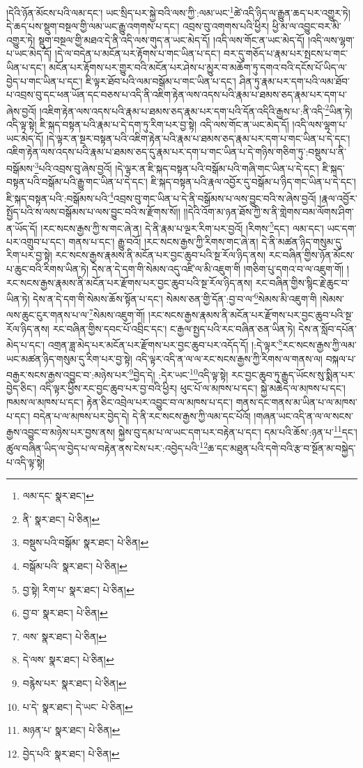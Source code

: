 །དེའི་ཉོན་མོངས་པའི་ལམ་དང་། ཡང་སྲིད་པར་སྐྱེ་བའི་ལས་ཀྱི་:ལམ་ཡང་\footnote{ལམ་དང་  སྣར་ཐང་། }ཚེ་འདི་ཉིད་ལ་རྒྱུན་ཆད་པར་འགྱུར་ཏེ། དེ་ཆད་པས་སྡུག་བསྔལ་གྱི་ལམ་ཡང་རྒྱུ་འགགས་པ་དང་། འབྲས་བུ་འགགས་པའི་ཕྱིར། ཕྱི་མ་ལ་འབྱུང་བར་མི་འགྱུར་ཏེ། སྡུག་བསྔལ་གྱི་མཐའ་དེ་ནི་འདི་ལས་གུད་ན་ཡང་མེད་དོ། །འདི་ལས་གོང་ན་ཡང་མེད་དོ། །འདི་ལས་ལྷག་པ་ཡང་མེད་དོ། །དེ་ལ་བདེན་པ་མངོན་པར་རྟོགས་པ་གང་ཡིན་པ་དང་། བར་དུ་གཅོད་པ་རྣམ་པར་སྤངས་པ་གང་ཡིན་པ་དང་། མངོན་པར་རྟོགས་པར་གྱུར་བའི་མངོན་པར་ཤེས་པ་མྱུར་བ་མཆོག་ཏུ་དགའ་བའི་དངོས་པོ་ཡིད་ལ་བྱེད་པ་གང་ཡིན་པ་དང་། ཇི་ལྟར་ཐོབ་པའི་ལམ་བསྒོམ་པ་གང་ཡིན་པ་དང་། ཤིན་ཏུ་རྣམ་པར་དག་པའི་ལམ་ཐོབ་པ་འབྲས་བུ་དང་ཕན་ཡོན་དང་བཅས་པ་འདི་ནི་འཇིག་རྟེན་ལས་འདས་པའི་རྣམ་པ་ཐམས་ཅད་རྣམ་པར་དག་པ་ཞེས་བྱའོ། །འཇིག་རྟེན་ལས་འདས་པའི་རྣམ་པ་ཐམས་ཅད་རྣམ་པར་དག་པའི་དོན་འདིའི་རྒྱས་པ་:ནི་འདི་\footnote{ནི་  སྣར་ཐང་།  པེ་ཅིན། }ཡིན་ཏེ། འདི་ལྟ་སྟེ། ཇི་སྐད་བསྟན་པའི་རྣམ་པ་དེ་དག་ཏུ་རིག་པར་བྱ་སྟེ། འདི་ལས་གོང་ན་ཡང་མེད་དོ། །འདི་ལས་ལྷག་པ་ཡང་མེད་དོ། །དེ་ལྟར་ན་སྔར་བསྟན་པའི་འཇིག་རྟེན་པའི་རྣམ་པ་ཐམས་ཅད་རྣམ་པར་དག་པ་གང་ཡིན་པ་དེ་དང་། འཇིག་རྟེན་ལས་འདས་པའི་རྣམ་པ་ཐམས་ཅད་དུ་རྣམ་པར་དག་པ་གང་ཡིན་པ་དེ་གཉིས་གཅིག་ཏུ་:བསྡུས་པ་ནི་བསྒོམས་\footnote{བསྡུས་པའི་བསྒོམ་  སྣར་ཐང་།  པེ་ཅིན། }པའི་འབྲས་བུ་ཞེས་བྱའོ། །དེ་ལྟར་ན་ཇི་སྐད་བསྟན་པའི་བསྒོམ་པའི་གཞི་གང་ཡིན་པ་དེ་དང་། ཇི་སྐད་བསྟན་པའི་བསྒོམ་པའི་རྒྱུ་གང་ཡིན་པ་དེ་དང་། ཇི་སྐད་བསྟན་པའི་རྣལ་འབྱོར་དུ་བསྒོམ་པ་ཉིད་གང་ཡིན་པ་དེ་དང་། ཇི་སྐད་བསྟན་པའི་:བསྒོམས་པའི་\footnote{བསྒོམ་པའི་  སྣར་ཐང་།  པེ་ཅིན། }འབྲས་བུ་གང་ཡིན་པ་དེ་ནི་བསྒོམས་པ་ལས་བྱུང་བའི་ས་ཞེས་བྱའོ། །རྣལ་འབྱོར་སྤྱོད་པའི་ས་ལས་བསྒོམས་པ་ལས་བྱུང་བའི་ས་རྫོགས་སོ།། །།དེའི་འོག་མ་ཉན་ཐོས་ཀྱི་ས་ནི་གླེགས་བམ་ལོགས་ཤིག་ན་ཡོད་དོ། །རང་སངས་རྒྱས་ཀྱི་ས་གང་ཞེ་ན། དེ་ནི་རྣམ་པ་ལྔར་རིག་པར་བྱའོ། །རིགས་\footnote{བྱ་སྟེ། རིག་པ་  སྣར་ཐང་།  པེ་ཅིན། }དང་། ལམ་དང་། ཡང་དག་པར་འགྲུབ་པ་དང་། གནས་པ་དང་། རྒྱུ་བའོ། །རང་སངས་རྒྱས་ཀྱི་རིགས་གང་ཞེ་ན། དེ་ནི་མཚན་ཉིད་གསུམ་དུ་རིག་པར་བྱ་སྟེ། རང་སངས་རྒྱས་རྣམས་ནི་མངོན་པར་བྱང་ཆུབ་པའི་སྔ་རོལ་ཉིད་ནས། རང་བཞིན་གྱིས་ཉོན་མོངས་པ་ཆུང་བའི་རིགས་ཡིན་ཏེ། དེས་ན་དེ་དག་གི་སེམས་འདུ་འཛི་ལ་མི་འཇུག་གི །གཅིག་པུ་དགའ་བ་ལ་འཇུག་གོ། །རང་སངས་རྒྱས་རྣམས་ནི་མངོན་པར་རྫོགས་པར་བྱང་ཆུབ་པའི་སྔ་རོལ་ཉིད་ནས། རང་བཞིན་གྱིས་སྙིང་རྗེ་ཆུང་བ་ཡིན་ཏེ། དེས་ན་དེ་དག་གི་སེམས་ཆོས་སྟོན་པ་དང་། སེམས་ཅན་གྱི་དོན་:བྱ་བ་ལ་\footnote{བྱ་བ་  སྣར་ཐང་།  པེ་ཅིན། }སེམས་མི་འཇུག་གི །སེམས་ལས་ཆུང་ངུར་གནས་པ་ལ་\footnote{ལས་  སྣར་ཐང་།  པེ་ཅིན། }སེམས་འཇུག་གོ། །རང་སངས་རྒྱས་རྣམས་ནི་མངོན་པར་རྫོགས་པར་བྱང་ཆུབ་པའི་སྔ་རོལ་ཉིད་ནས། རང་བཞིན་གྱིས་དབང་པོ་འབྲིང་དང་། ང་རྒྱལ་སྤྱད་པའི་རང་བཞིན་ཅན་ཡིན་ཏེ། དེས་ན་སློབ་དཔོན་མེད་པ་དང་། འགྲན་ཟླ་མེད་པར་མངོན་པར་རྫོགས་པར་བྱང་ཆུབ་པར་འདོད་དོ། །:དེ་ལྟར་\footnote{དེ་ལས་  སྣར་ཐང་།  པེ་ཅིན། }རང་སངས་རྒྱས་ཀྱི་ལམ་ཡང་མཚན་ཉིད་གསུམ་དུ་རིག་པར་བྱ་སྟེ། འདི་ལྟར་འདི་ན་ལ་ལ་རང་སངས་རྒྱས་ཀྱི་རིགས་ལ་གནས་ལ། བསྐལ་པ་བརྒྱར་སངས་རྒྱས་འབྱུང་བ་:མཉེས་པར་\footnote{བརྙེས་པར་  སྣར་ཐང་།  པེ་ཅིན། }བྱེད་དེ། :དེར་ཡང་\footnote{པ་དེ་  སྣར་ཐང་། དེ་ཡང་  པེ་ཅིན། }འདི་ལྟ་སྟེ། རང་བྱང་ཆུབ་ཏུ་རྒྱུད་ཡོངས་སུ་སྨིན་པར་བྱེད་ཅིང་། འདི་ལྟར་ཕྱིས་རང་བྱང་ཆུབ་པར་བྱ་བའི་ཕྱིར། ཕུང་པོ་ལ་མཁས་པ་དང་། སྐྱེ་མཆེད་ལ་མཁས་པ་དང་། ཁམས་ལ་མཁས་པ་དང་། རྟེན་ཅིང་འབྲེལ་པར་འབྱུང་བ་ལ་མཁས་པ་དང་། གནས་དང་གནས་མ་ཡིན་པ་ལ་མཁས་པ་དང་། བདེན་པ་ལ་མཁས་པར་བྱེད་དེ། དེ་ནི་རང་སངས་རྒྱས་ཀྱི་ལམ་དང་པོའོ། །གཞན་ཡང་འདི་ན་ལ་ལ་སངས་རྒྱས་འབྱུང་བ་མཉེས་པར་བྱས་ནས། སྐྱེས་བུ་དམ་པ་ལ་ཡང་དག་པར་བརྟེན་པ་དང་། དམ་པའི་ཆོས་:ཉན་པ་\footnote{མཉན་པ་  སྣར་ཐང་།  པེ་ཅིན། }དང་། ཚུལ་བཞིན་ཡིད་ལ་བྱེད་པ་ལ་བརྟེན་ནས་ངེས་པར་:འབྱེད་པའི་\footnote{བྱེད་པའི་  སྣར་ཐང་།  པེ་ཅིན། }ཆ་དང་མཐུན་པའི་དགེ་བའི་རྩ་བ་སྔོན་མ་བསྐྱེད་པ་འདི་ལྟ་སྟེ། 